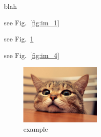 \documentclass[PICOReport.tex]{subfiles}
\begin{document}
blah

see Fig.~\ref{fig:im_1}

see Fig.~\ref{fig:im_2}

see Fig.~\ref{fig:im_4}

\begin{figure}[!htb]
\centering
\includegraphics[width=4cm]{images/example}
\caption{example}
\label{fig:im_2}
\end{figure}
\end{document}
